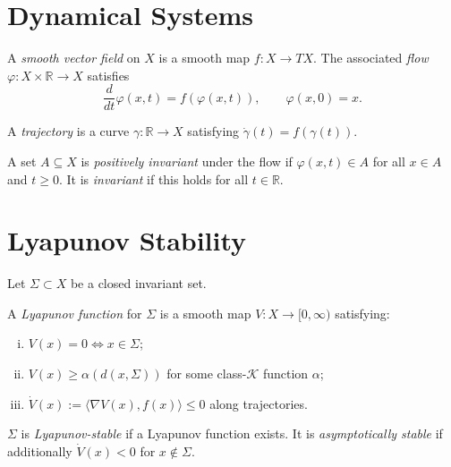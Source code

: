\documentclass[11pt,openany]{book}
\begin{document}
\section{Dynamical Systems}
\label{sec:dynamical-systems}

\begin{definition}
A \emph{smooth vector field} on $X$ is a smooth map
$f : X \to TX$.  The associated \emph{flow}
$\varphi : X \times \mathbb{R} \to X$ satisfies
\[
  \frac{d}{dt}\varphi(x,t) = f(\varphi(x,t)),
  \qquad \varphi(x,0) = x.
\]
\end{definition}

\begin{definition}[Trajectory]
A \emph{trajectory} is a curve $\gamma : \mathbb{R} \to X$
satisfying $\dot\gamma(t) = f(\gamma(t))$.
\end{definition}

\begin{definition}
A set $A \subseteq X$ is \emph{positively invariant} under
the flow if $\varphi(x,t) \in A$ for all $x \in A$ and
$t \ge 0$.  It is \emph{invariant} if this holds for all
$t \in \mathbb{R}$.
\end{definition}

\section{Lyapunov Stability}
\label{sec:lyapunov}

Let $\Sigma \subset X$ be a closed invariant set.

\begin{definition}
A \emph{Lyapunov function} for $\Sigma$ is a smooth map
$V : X \to [0,\infty)$ satisfying:
\begin{enumerate}[(i)]
  \item $V(x) = 0 \iff x \in \Sigma$;
  \item $V(x) \ge \alpha(d(x,\Sigma))$ for some
    class-$\mathcal{K}$ function $\alpha$;
  \item $\dot{V}(x) := \langle \nabla V(x), f(x)\rangle
    \le 0$ along trajectories.
\end{enumerate}
\end{definition}

\begin{definition}
$\Sigma$ is \emph{Lyapunov-stable} if a Lyapunov function
exists.  It is \emph{asymptotically stable} if additionally
$\dot{V}(x) < 0$ for $x \notin \Sigma$.
\end{definition}
\end{document}
